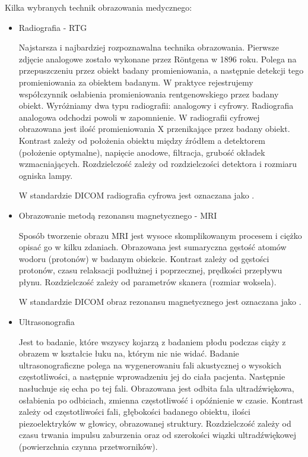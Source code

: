 Kilka wybranych technik obrazowania medycznego:
\begin{itemize}
    \item Radiografia - RTG

    Najstarsza i najbardziej rozpoznawalna technika obrazowania.
    Pierwsze zdjęcie analogowe zostało wykonane przez Röntgena w 1896 roku.
    Polega na przepuszczeniu przez obiekt badany promieniowania, a następnie detekcji tego promieniowania za obiektem badanym.
    W praktyce rejestrujemy współczynnik osłabienia promieniowania rentgenowskiego przez badany obiekt.
    Wyróżniamy dwa typu radiografii: analogowy i cyfrowy.
    Radiografia analogowa odchodzi powoli w zapomnienie.
    W radiografii cyfrowej obrazowana jest ilość promieniowania X przenikające przez badany obiekt.
    Kontrast zależy od położenia obiektu między źródłem a detektorem (położenie optymalne), napięcie anodowe, filtracja, grubość okładek wzmacniających.
    Rozdzielczość zależy od rozdzielczości detektora i rozmiaru ogniska lampy.

    W standardzie DICOM radiografia cyfrowa jest oznaczana jako .

    \item Obrazowanie metodą rezonansu magnetycznego - MRI

    Sposób tworzenie obrazu MRI jest wysoce skomplikowanym procesem i ciężko opisać go w kilku zdaniach.
    Obrazowana jest sumaryczna gęstość atomów wodoru (protonów) w badanym obiekcie.
    Kontrast zależy od gęstości protonów, czasu relaksacji podłużnej i poprzecznej, prędkości przepływu płynu.
    Rozdzielczość zależy od parametrów skanera (rozmiar woksela).
    
    W standardzie DICOM obraz rezonansu magnetycznego jest oznaczana jako .
    
    \item Ultrasonografia
    
    Jest to badanie, które wszyscy kojarzą z badaniem płodu podczas ciąży z obrazem w kształcie łuku na, którym nic nie widać.
    Badanie ultrasonograficzne polega na wygenerowaniu fali akustycznej o wysokich częstotliwości, a następnie wprowadzeniu jej do ciała pacjenta.
    Następnie nasłuchuje się echa po tej fali.
    Obrazowana jest odbita fala ultradźwiękowa, osłabienia po odbiciach, zmienna częstotliwość i opóźnienie w czasie.
    Kontrast zależy od częstotliwości fali, głębokości badanego obiektu, ilości piezoelektryków w głowicy, obrazowanej struktury.
    Rozdzielczość zależy od czasu trwania impulsu zaburzenia oraz od szerokości wiązki ultradźwiękowej (powierzchnia czynna przetworników).


\end{itemize}
